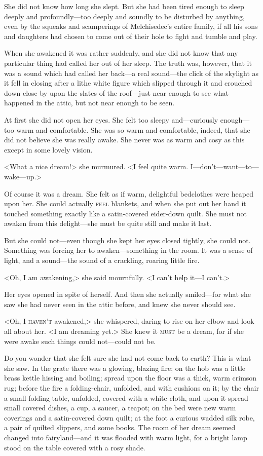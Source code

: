 She did not know how long she slept. But she had been tired enough to sleep deeply and profoundly—too deeply and soundly to be disturbed by anything, even by the squeaks and scamperings of Melchisedec's entire family, if all his sons and daughters had chosen to come out of their hole to fight and tumble and play.

When she awakened it was rather suddenly, and she did not know that any particular thing had called her out of her sleep. The truth was, however, that it was a sound which had called her back—a real sound—the click of the skylight as it fell in closing after a lithe white figure which slipped through it and crouched down close by upon the slates of the roof—just near enough to see what happened in the attic, but not near enough to be seen.

At first she did not open her eyes. She felt too sleepy and—curiously enough—too warm and comfortable. She was so warm and comfortable, indeed, that she did not believe she was really awake. She never was as warm and cosy as this except in some lovely vision.

<What a nice dream!> she murmured. <I feel quite warm. I—don't—want—to—wake—up.>

Of course it was a dream. She felt as if warm, delightful bedclothes were heaped upon her. She could actually \textsc{feel} blankets, and when she put out her hand it touched something exactly like a satin-covered eider-down quilt. She must not awaken from this delight—she must be quite still and make it last.

But she could not—even though she kept her eyes closed tightly, she could not. Something was forcing her to awaken—something in the room. It was a sense of light, and a sound—the sound of a crackling, roaring little fire.

<Oh, I am awakening,> she said mournfully. <I can't help it—I can't.>

Her eyes opened in spite of herself. And then she actually smiled—for what she saw she had never seen in the attic before, and knew she never should see.

<Oh, I \textsc{haven't} awakened,> she whispered, daring to rise on her elbow and look all about her. <I am dreaming yet.> She knew it \textsc{must} be a dream, for if she were awake such things could not—could not be.

Do you wonder that she felt sure she had not come back to earth? This is what she saw. In the grate there was a glowing, blazing fire; on the hob was a little brass kettle hissing and boiling; spread upon the floor was a thick, warm crimson rug; before the fire a folding-chair, unfolded, and with cushions on it; by the chair a small folding-table, unfolded, covered with a white cloth, and upon it spread small covered dishes, a cup, a saucer, a teapot; on the bed were new warm coverings and a satin-covered down quilt; at the foot a curious wadded silk robe, a pair of quilted slippers, and some books. The room of her dream seemed changed into fairyland—and it was flooded with warm light, for a bright lamp stood on the table covered with a rosy shade.

